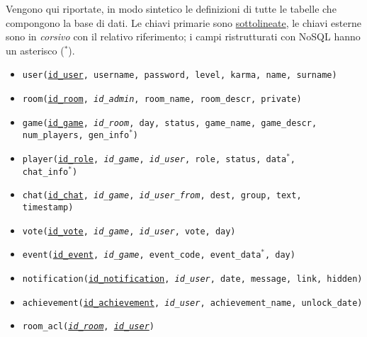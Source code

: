 Vengono qui riportate, in modo sintetico le definizioni di tutte le tabelle che compongono la base di dati. Le chiavi primarie sono \underline{sottolineate}, le chiavi esterne sono in \emph{corsivo} con il relativo riferimento; i campi ristrutturati con NoSQL hanno un asterisco ($^*$).

\begin{itemize}
	\item \texttt{user(\underline{id\_user}, username, password, level, karma, name, surname)}
	\item \texttt{room(\underline{id\_room}, \emph{id\_admin}, room\_name, room\_descr, private)}
	\item \texttt{game(\underline{id\_game}, \emph{id\_room}, day, status, game\_name, game\_descr, \\num\_players, gen\_info$^*$)}
	\item \texttt{player(\underline{id\_role}, \emph{id\_game}, \emph{id\_user}, role, status, data$^*$, \\chat\_info$^*$)}
	\item \texttt{chat(\underline{id\_chat}, \emph{id\_game}, \emph{id\_user\_from}, dest, group, text, \\timestamp)}
	\item \texttt{vote(\underline{id\_vote}, \emph{id\_game}, \emph{id\_user}, vote, day)}
	\item \texttt{event(\underline{id\_event}, \emph{id\_game},  event\_code, event\_data$^*$, day)}
	\item \texttt{notification(\underline{id\_notification}, \emph{id\_user}, date, message, link, hidden)}
	\item \texttt{achievement(\underline{id\_achievement}, \emph{id\_user}, achievement\_name, unlock\_date)}
	\item \texttt{room\_acl(\underline{\emph{id\_room}}, \underline{\emph{id\_user}})}
\end{itemize}